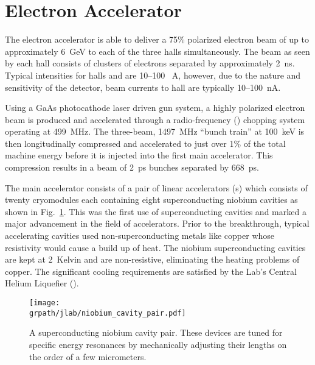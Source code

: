 \section{\label{sec:clas.acc}Electron Accelerator}

The  electron accelerator is able to deliver a 75\% polarized electron beam of up to approximately 6~GeV to each of the three halls simultaneously. The beam as seen by each hall consists of clusters of electrons separated by approximately 2~ns. Typical intensities for halls  and  are 10--100~\text{$\mu$} A, however, due to the nature and sensitivity of the  detector, beam currents to hall  are typically 10--100~nA.

Using a GaAs photocathode laser driven gun system, a highly polarized electron beam is produced and accelerated through a radio-frequency () chopping system operating at 499~MHz. The three-beam, 1497~MHz ``bunch train'' at 100~keV is then longitudinally compressed and accelerated to just over 1\% of the total machine energy before it is injected into the first main accelerator. This compression results in a beam of 2~ps bunches separated by 668~ps.

The main accelerator consists of a pair of linear accelerators (s\label{abbr:linac}) which consists of twenty cryomodules each containing eight superconducting niobium cavities as shown in Fig.~\ref{fig:jlab.cavity}. This was the first use of superconducting cavities and marked a major advancement in the field of accelerators. Prior to the  breakthrough, typical accelerating cavities used non-superconducting metals like copper whose resistivity would cause a build up of heat. The niobium superconducting cavities are kept at 2~Kelvin and are non-resistive, eliminating the heating problems of copper. The significant cooling requirements are satisfied by the Lab's Central Helium Liquefier (\label{abbr:chl}).

\begin{figure}\begin{center} 
\texttt{[image: \\grpath/jlab/niobium\_cavity\_pair.pdf]}
\caption[Niobium Cavity Pair (photograph)]{\label{fig:jlab.cavity}A superconducting niobium cavity pair. These devices are tuned for specific energy resonances by mechanically adjusting their lengths on the order of a few micrometers.}
\end{center}\end{figure}

